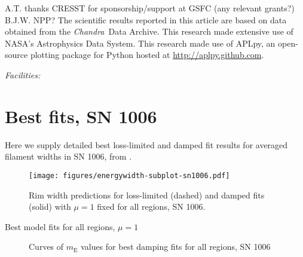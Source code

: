 \documentclass[iop, apj, numberedappendix]{emulateapj}
\newcommand*{\mt}{\mathrm}
\newcommand*{\Chandra}{\textit{Chandra}\ }
\newcommand*{\mE}{m_\mt{E}}
\begin{document}
\acknowledgments

A.T. thanks CRESST for sponsorship/support at GSFC (any relevant grants?)
B.J.W. NPP?
The scientific results reported in this article are based on data obtained from
the \Chandra Data Archive.
This research made extensive use of NASA's Astrophysics Data System.
This research made use of APLpy, an open-source plotting package for Python
hosted at \href{http://aplpy.github.com}{http://aplpy.github.com}.

{\it Facilities:} 

\clearpage
\appendix

\setcounter{table}{0}
\renewcommand{\thetable}{A\arabic{table}}
\setcounter{figure}{0}
\renewcommand{\thefigure}{A\arabic{figure}}

\section{Best fits, SN 1006}

Here we supply detailed best loss-limited and damped fit results for averaged
filament widths in SN 1006, from \citet{ressler2014}.

\begin{figure*}[h]
    \centering
    \texttt{[image: figures/energywidth-subplot-sn1006.pdf]}
    \caption{Rim width predictions for loss-limited (dashed) and damped fits
        (solid) with $\mu = 1$ fixed for all regions, SN 1006.}
\end{figure*}

\begin{table}[h]
    \footnotesize
    \centering
    \caption{Best model fits for all regions, $\mu = 1$}
    
\end{table}

\clearpage
\begin{figure}
    \centering
    \iftoggle{manuscript}{
        \texttt{[image: figures/mE-damp-sn1006.pdf]}
    }{
        \texttt{[image: figures/mE-damp-sn1006.pdf]}
    }
    \caption{Curves of $\mE$ values for best damping fits for all regions,
        SN 1006}
\end{figure}
\end{document}
